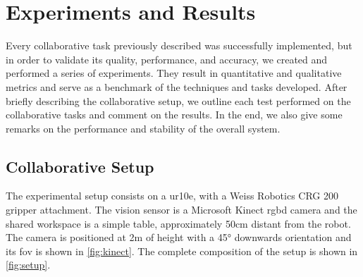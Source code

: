 \chapter{Experiments and Results}
\label{chp:6-tests}

\par Every collaborative task previously described was successfully implemented, but in order to validate its quality, performance, and accuracy, we created and performed a series of experiments. They result in quantitative and qualitative metrics and serve as a benchmark of the techniques and tasks developed. After briefly describing the collaborative setup, we outline each test performed on the collaborative tasks and comment on the results. In the end, we also give some remarks on the performance and stability of the overall system.





\section{Collaborative Setup}

\par The experimental setup consists on a \ac{ur10e}, with a Weiss Robotics CRG 200 gripper attachment. The vision sensor is a Microsoft Kinect \acs{rgbd} camera and the shared workspace is a simple table, approximately 50cm distant from the robot. The camera is positioned at 2m of height with a \ang{45} downwards orientation and its \ac{fov} is shown in \autoref{fig:kinect}. The complete composition of the setup is shown in \autoref{fig:setup}.

